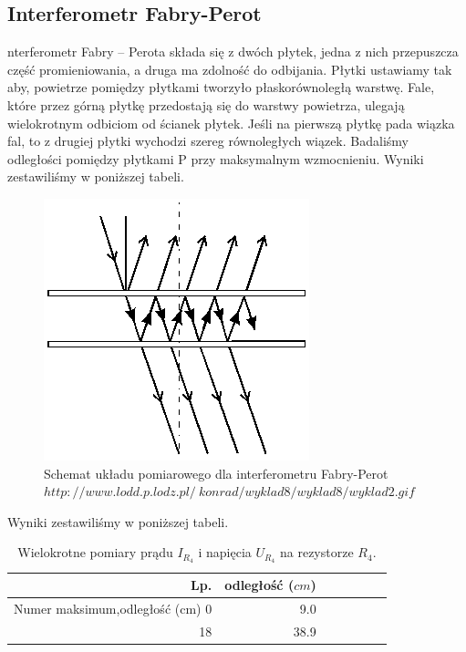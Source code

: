 \documentclass[a4paper]{article}
\newlength{\du}
\begin{document}
\subsection{Interferometr Fabry-Perot}
nterferometr Fabry – Perota składa się z dwóch płytek, jedna z nich przepuszcza część promieniowania, a druga ma zdolność do odbijania. Płytki ustawiamy tak aby, powietrze pomiędzy płytkami tworzyło płaskorównoległą warstwę. Fale, które przez górną płytkę przedostają się do warstwy powietrza, ulegają wielokrotnym odbiciom od ścianek płytek. Jeśli na pierwszą płytkę pada wiązka fal, to z drugiej płytki wychodzi szereg równoległych wiązek. Badaliśmy odległości pomiędzy płytkami P przy maksymalnym wzmocnieniu. Wyniki zestawiliśmy w poniższej tabeli. 

\begin{figure}[h]
\centering
\includegraphics[scale=0.7]{fabry_perot.png}
\caption{Schemat układu pomiarowego dla interferometru Fabry-Perot $http://www.lodd.p.lodz.pl/~konrad/wyklad8/wyklad8/wyklad2.gif$}
\label{michelson}
\end{figure}

Wyniki zestawiliśmy w poniższej tabeli. 

\begin{table}
\centering
\begin{tabular}{rrrrrrr}
\toprule
Lp. &  odległość ($cm$) \\
\midrule
Numer maksimum,odległość (cm)
0 & 9.0 \\
18 & 38.9 \\
\bottomrule
\end{tabular}
\caption{Wielokrotne pomiary prądu $I_{R_4}$ i napięcia $U_{R_4}$ na rezystorze $R_4$.}
\label{pomiary_fabry_perot}
\end{table}
\end{document}
